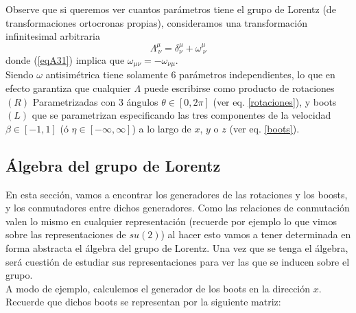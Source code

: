 
\vspace{0.4cm}
Observe que si queremos ver cuantos parámetros tiene el grupo de Lorentz (de transformaciones ortocronas propias), consideramos una transformación infinitesimal arbitraria 
\begin{equation}
    \Lambda^{\mu}_{~\nu}=\delta^{\mu}_{\nu}+\omega^{\mu}_{~\nu}
\end{equation}
donde (\ref{eqA31}) implica que $\omega_{\mu \nu}=-\omega_{\nu \mu}$.\\

Siendo $\omega$ antisimétrica tiene solamente 6 parámetros independientes, lo que en efecto garantiza que cualquier $\Lambda$ puede escribirse como producto de rotaciones $(R)$ Parametrizadas con 3 ángulos $\theta \in [0,2\pi]$ (ver eq. \ref{rotaciones}), y boots $(L)$ que se parametrizan especificando las tres componentes de la velocidad $\beta \in [-1,1]$ (ó $\eta \in [-\infty,\infty]$) a lo largo de $x$, $y$ o $z$ (ver eq. \ref{boots}).  



\subsection{Álgebra del grupo de Lorentz}

En esta sección, vamos a encontrar los generadores de las rotaciones y los boosts, y los conmutadores entre dichos generadores. Como las relaciones de conmutación valen lo mismo en cualquier representación (recuerde por ejemplo lo que vimos sobre las representaciones de $su(2)$) al hacer esto vamos a tener determinada en forma abstracta el álgebra del grupo de Lorentz. Una vez que se tenga el álgebra, será cuestión de estudiar sus representaciones para ver las que se inducen sobre el grupo.\\

A modo de ejemplo, calculemos el generador de los boots en la dirección $x$. Recuerde que dichos boots se representan por la siguiente matriz:

